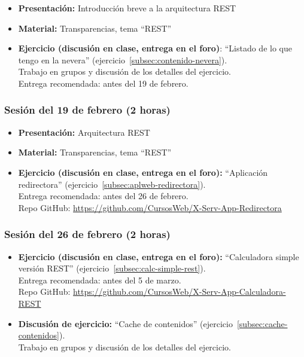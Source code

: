 \documentclass[a4paper,12pt]{article}
\begin{document}
\begin{itemize}
\item \textbf{Presentación:} Introducción breve a la arquitectura REST
\item \textbf{Material:} Transparencias, tema ``REST''
\item \textbf{Ejercicio (discusión en clase, entrega en el foro)}: ``Listado de lo que tengo en la nevera'' (ejercicio~\ref{subsec:contenido-nevera}). \\
  Trabajo en grupos y discusión de los detalles del ejercicio. \\
  Entrega recomendada: antes del 19 de febrero.
\end{itemize}

\subsubsection{Sesión del 19 de febrero (2 horas)}

\begin{itemize}
\item \textbf{Presentación:} Arquitectura REST
\item \textbf{Material:} Transparencias, tema ``REST''
\item \textbf{Ejercicio (discusión en clase, entrega en el foro):} ``Aplicación redirectora'' (ejercicio~\ref{subsec:aplweb-redirectora}). \\
  Entrega recomendada: antes del 26 de febrero. \\
  Repo GitHub: \url{https://github.com/CursosWeb/X-Serv-App-Redirectora}
\end{itemize}


\subsubsection{Sesión del 26 de febrero (2 horas)}

\begin{itemize}
\item \textbf{Ejercicio (discusión en clase, entrega en el foro):} ``Calculadora simple versión REST'' (ejercicio~\ref{subsec:calc-simple-rest}). \\
  Entrega recomendada: antes del 5 de marzo. \\
  Repo GitHub: \url{https://github.com/CursosWeb/X-Serv-App-Calculadora-REST}
\item \textbf{Discusión de ejercicio:} ``Cache de contenidos'' (ejercicio~\ref{subsec:cache-contenidos}). \\
  Trabajo en grupos y discusión de los detalles del ejercicio.
\end{itemize}
\end{document}
